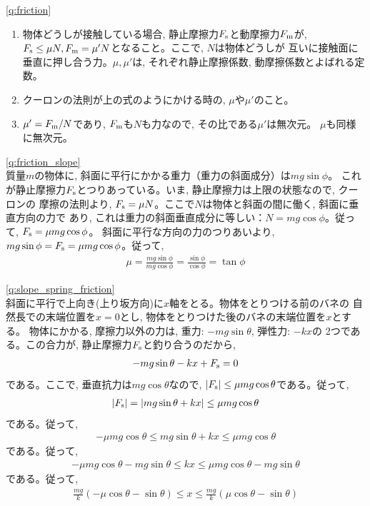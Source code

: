 %
\ref{q:friction}
\begin{enumerate}
\item 物体どうしが接触している場合, 静止摩擦力$F_{\text s}$と動摩擦力$F_{\text m}$が, 
$F_{\text s} \leq \mu N, F_{\text m}=\mu' N$となること。ここで, $N$は物体どうしが
互いに接触面に垂直に押し合う力。$\mu, \mu'$は, それぞれ静止摩擦係数, 
動摩擦係数とよばれる定数。
\item クーロンの法則が上の式のようにかける時の, $\mu$や$\mu'$のこと。
\item $\mu'=F_{\text m}/N$であり, $F_{\text m}$も$N$も力なので, その比である$\mu'$は無次元。
$\mu$も同様に無次元。
\end{enumerate}
\mv

\ref{q:friction_slope}\\
質量$m$の物体に, 斜面に平行にかかる重力（重力の斜面成分）は$mg \sin \phi$。
これが静止摩擦力$F_{\text s}$とつりあっている。いま, 静止摩擦力は上限の状態なので, クーロンの
摩擦の法則より, $F_{\text s}=\mu N$。ここで$N$は物体と斜面の間に働く, 斜面に垂直方向の力で
あり, これは重力の斜面垂直成分に等しい：$N=mg\cos\phi$。従って, $F_{\text s}=\mu mg\cos\phi$。
斜面に平行な方向の力のつりあいより, $mg \sin \phi=F_{\text s}=\mu mg\cos\phi$。従って, 
\begin{eqnarray}\mu=\frac{mg\sin\phi}{mg\cos\phi}=\frac{\sin\phi}{\cos\phi}=\tan\phi\end{eqnarray}
\mv

\ref{q:slope_spring_friction}\\
斜面に平行で上向き(上り坂方向)に$x$軸をとる。物体をとりつける前のバネの
自然長での末端位置を$x=0$とし, 物体をとりつけた後のバネの末端位置を$x$とする。
物体にかかる, 摩擦力以外の力は, 重力: $-mg\sin\theta$, 弾性力: $-kx$の
2つである。この合力が, 静止摩擦力$F_{\text s}$と釣り合うのだから, 
\begin{eqnarray}-mg\sin\theta-kx+F_{\text s}=0\end{eqnarray}
である。ここで, 垂直抗力は$mg\cos\theta$なので, 
$|F_{\text s}|\leq\mu mg\cos\theta$である。従って, 
\begin{eqnarray}|F_{\text s}|=|mg\sin\theta+kx|\leq\mu mg\cos\theta\end{eqnarray}
である。従って, 
\begin{eqnarray}-\mu mg\cos\theta\leq mg\sin\theta+kx\leq\mu mg\cos\theta\end{eqnarray}
である。従って, 
\begin{eqnarray*}-\mu mg\cos\theta-mg\sin\theta\leq kx\leq\mu mg\cos\theta-mg\sin\theta\end{eqnarray*}
である。従って, 
\begin{eqnarray*}\frac{mg}{k}(-\mu \cos\theta-\sin\theta)\leq x\leq\frac{mg}{k}(\mu \cos\theta-\sin\theta)\end{eqnarray*}\mv

